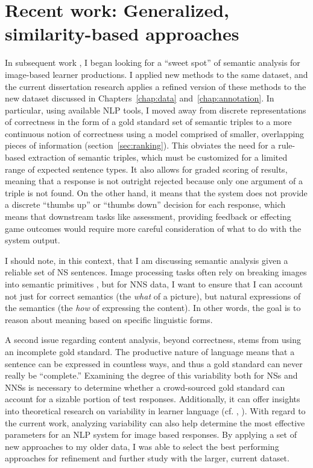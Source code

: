 \section{Recent work: Generalized, similarity-based approaches}
\label{sec:recent-work}

In subsequent work \citep{king:dickinson:16}, I began looking for a ``sweet spot'' of
semantic analysis \citep[cf.][]{bailey:meurers:08} for image-based learner productions. I applied new methods to the same dataset, and the current dissertation research applies a refined version of these methods to the new dataset discussed in Chapters~\ref{chap:data} and~\ref{chap:annotation}.
In particular, using available NLP tools, I moved away from discrete representations of correctness in the form of a gold standard set of semantic triples to a more continuous notion of correctness using a model comprised of smaller, overlapping pieces of information (section~\ref{sec:ranking}). This obviates the need for a rule-based extraction of semantic triples, which must be customized for a limited range of expected sentence types. It also allows for graded scoring of results, meaning that a response is not outright rejected because only one argument of a triple is not found. On the other hand, it means that the system does not provide a discrete ``thumbs up'' or ``thumbs down'' decision for each response, which means that downstream tasks like assessment, providing feedback or effecting game outcomes would require more careful consideration of what to do with the system output.

I should note, in this context, that I am discussing semantic
analysis given a reliable set of NS sentences.  Image processing
tasks often rely on breaking images into semantic primitives
\citep[see, e.g.,][and references therein]{ortiz:wolff:lapata:15}, but
for NNS data, I want to ensure that I can account not just for
correct semantics (the \emph{what} of a picture), but natural
expressions of the semantics (the \emph{how} of expressing the
content).  In other words, the goal is to reason about meaning based on
specific linguistic forms.

A second issue regarding content analysis, beyond correctness, stems
from using an incomplete gold standard. The productive nature of language means that a sentence can be expressed in countless ways, and thus a gold standard can never really be ``complete.'' Examining the degree of this variability both for NSs and NNSs is necessary to determine whether a crowd-sourced gold standard can account for a sizable portion of test responses. Additionally, it can offer insights into theoretical research on variability in learner language (cf. \citet{ellis1987variability}, \citet{kanno1998consistency}). With regard to the current work, analyzing variability can also help determine the most effective parameters for an NLP system for image based responses. By applying a set of new approaches to my older data, I was able to select the best performing approaches for refinement and further study with the larger, current dataset.
 

